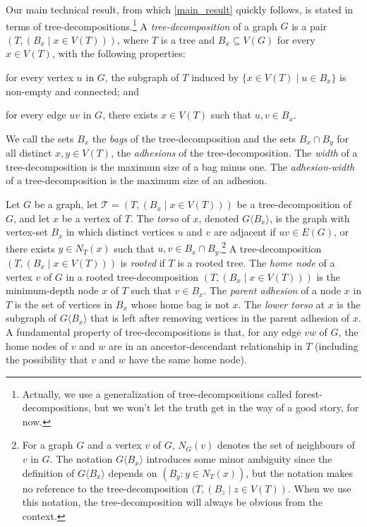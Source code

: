 \documentclass{patmorin}
\newcommand{\torso}[2]{{#1}\langle{#2}\rangle}
\newcommand{\defin}[1]{\emph{\textcolor{brightmaroon}{#1}}}
\newcommand{\calT}{\mathcal{T}}
\begin{document}
Our main technical result, from which \cref{main_result} quickly follows, is stated in terms of tree-decompositions.\footnote{Actually, we use a generalization of tree-decompositions called forest-decompositions, but we won't let the truth get in the way of a good story, for now.}  A \defin{tree-decomposition} of a graph $G$ is a pair $(T,(B_x \mid x \in V(T)))$,
where $T$ is a tree and $B_x \subseteq V(G)$ for every $x \in V(T)$, with the
following properties:
\begin{enumerate*}[label=(\alph*)]
	\item for every vertex $u$ in $G$, the subgraph of $T$ induced by $\{x \in V(T) \mid u \in B_x\}$ is non-empty and connected; and
	\item for every edge $uv$ in $G$, there exists $x\in V(T)$ such that $u,v\in B_x$.
\end{enumerate*}
We call the sets $B_x$ the \defin{bags} of the tree-decomposition and the sets $B_x\cap B_y$ for all distinct $x,y\in V(T)$, the \defin{adhesions} of the tree-decomposition. The \defin{width} of a tree-decomposition is the maximum size of a bag minus one. The \defin{adhesion-width} of a tree-decomposition is the maximum size of an adhesion.



Let $G$ be a graph,
let $\calT=(T,(B_x \mid x\in V(T)))$ be a tree-decomposition of $G$, and let $x$ be a vertex of $T$. The \defin{torso} of $x$, denoted \defin{$\torso{G}{B_x}$}, is the graph with vertex-set $B_x$ in which distinct vertices $u$ and $v$ are adjacent if $uv \in E(G)$, or there exists $y \in N_T(x)$  such that $u,v \in B_x \cap B_y$.\footnote{For a graph $G$ and a vertex $v$ of $G$, $N_G(v)$ denotes the set of neighbours of $v$ in $G$. The notation $\torso{G}{B_x}$ introduces some minor ambiguity since the definition of $\torso{G}{B_x}$ depends on $(B_y:y\in N_T(x))$, but the notation makes no reference to the tree-decomposition $(T, (B_z\mid z\in V(T))$.  When we use this notation, the tree-decomposition will always be obvious from the context.}
  A tree-decomposition $(T,(B_x \mid x\in V(T)))$ is \defin{rooted} if $T$ is a rooted tree.  The \defin{home node} of a vertex $v$ of $G$ in a rooted tree-decomposition $(T,(B_x \mid x\in V(T)))$ is the minimum-depth node $x$ of $T$ such that $v\in B_x$.  The \defin{parent adhesion} of a node $x$ in $T$ is the set of vertices in $B_x$ whose home bag  is not $x$.  The \defin{lower torso} at $x$ is the subgraph of $\torso{G}{B_x}$ that is left after removing vertices in the parent adhesion of $x$. A fundamental property of tree-decompositions is that, for any edge $vw$ of $G$, the home nodes of $v$ and $w$ are in an ancestor-descendant relationship in $T$ (including the possibility that $v$ and $w$ have the same home node).
\end{document}
